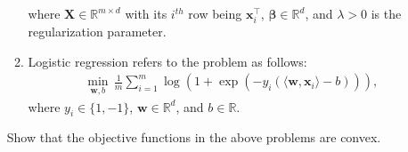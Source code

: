 \documentclass[11pt,letter,notitlepage]{article}
\theoremstyle{definition}
\begin{document}
\begin{exercise}
\begin{enumerate}
\begin{enumerate}
			            where $\mathbf{X}\in\mathbb{R}^{m\times d}$ with its $i^{th}$ row being $\mathbf{x}_i^{\top}$, $\boldsymbol{\beta} \in \mathbb{R}^d$, and $\lambda>0$ is the regularization parameter.
			      \item Logistic regression refers to the problem as follows:
			            \begin{align*}
				            \min_{\mathbf{w},b}\,\frac{1}{m}\sum_{i=1}^m\log\left(1+\exp(-y_i(\langle \mathbf{w},\mathbf{x}_i\rangle-b))\right),
			            \end{align*}
			            where $y_i\in\{1,-1\}$, $\mathbf{w}\in\mathbb{R}^d$, and $b\in\mathbb{R}$.
		      \end{enumerate}
		      Show that the objective functions in the above problems are convex.
	\end{enumerate}
\end{exercise}
\end{document}
